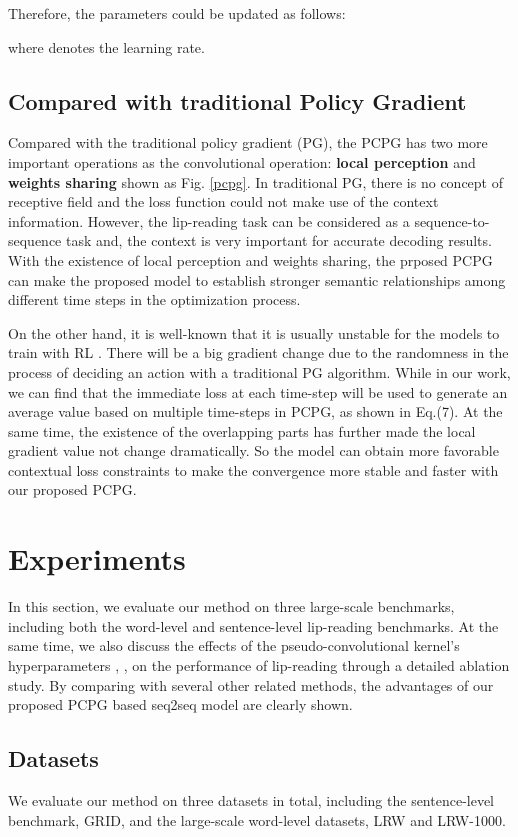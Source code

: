 \documentclass[a4paper, 10pt, conference]{ieeeconf}      \usepackage{FG2020}
\begin{document}
Therefore,  the parameters could be updated as follows: 


where  denotes the learning rate.

\subsection{Compared with traditional Policy Gradient}   \label{section3.4}
Compared with the traditional policy gradient (PG), the PCPG has two more important operations as the convolutional operation: \textbf{local perception} and \textbf{weights sharing} shown as Fig. \ref{pcpg}. In traditional PG, there is no concept of receptive field and the loss function could not make use of the context information. However, the lip-reading task can be considered as a sequence-to-sequence task and, the context is very important for accurate decoding results. With the existence of local perception and weights sharing, the prposed PCPG can make the proposed model to establish stronger semantic relationships among different time steps in the optimization process.

On the other hand, it is well-known that it is usually unstable for the models to train with RL \cite{Berkenkamp2017, Nikishin2018, Jin2019}. There will be a big gradient change due to the randomness in the process of deciding an action with a traditional PG algorithm. While in our work, we can find that the immediate loss  at each time-step will be used to generate an average value based on multiple time-steps in PCPG, as shown in Eq.(7). 
At the same time, the existence of the overlapping parts has further made the local gradient value not change dramatically. 
So the model can obtain more favorable contextual loss constraints to make the convergence more stable and faster with our proposed PCPG.



\section{Experiments}  \label{section4}
In this section, we evaluate our method on three large-scale benchmarks, including both the word-level and sentence-level lip-reading benchmarks. At the same time, we also discuss the effects of the pseudo-convolutional kernel's hyperparameters , ,  on the performance of lip-reading through a detailed ablation study. By comparing with several other related methods, the advantages of our proposed PCPG based seq2seq model are clearly shown.
\subsection{Datasets}
We evaluate our method on three datasets in total, including the sentence-level benchmark, GRID,  and the large-scale word-level datasets, LRW and LRW-1000.
\end{document}
